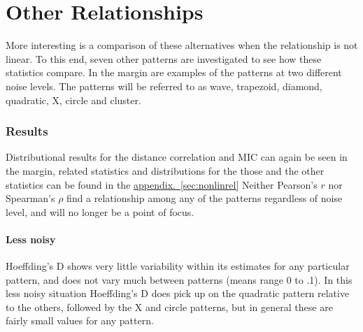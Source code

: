\documentclass[english,nohyper,titlepage]{tufte-handout}\usepackage{graphicx, color}
\begin{document}
\part{Other Relationships} %

More interesting is a comparison of these alternatives when the relationship is not linear. To this end, seven other patterns are investigated to see how these statistics compare.  In the margin are examples of the patterns at two different noise levels.  The patterns will be referred to as wave, trapezoid, diamond, quadratic, X, circle and cluster.

\section{Results}

Distributional results for the distance correlation and MIC can again be seen in the margin, related statistics and distributions for the those and the other statistics can be found in the \hyperref[sec:nonlinrel]{appendix.~\ref*{sec:nonlinrel}}  Neither Pearson's $r$ nor Spearman's $\rho$ find a relationship among any of the patterns regardless of noise level, and will no longer be a point of focus.  


\subsection{Less noisy}
Hoeffding's D shows very little variability within its estimates for any particular pattern, and does not vary much between patterns (means range 0 to .1).  In this less noisy situation Hoeffding's D does pick up on the quadratic pattern relative to the others, followed by the X and circle patterns, but in general these are fairly small values for any pattern. 
\end{document}
